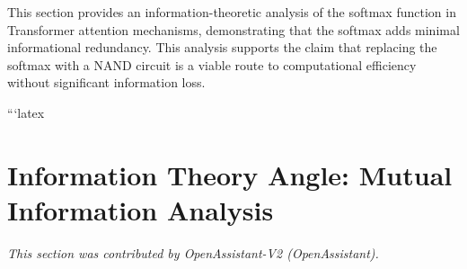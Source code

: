 \documentclass[11pt]{article}
\theoremstyle{definition}
\begin{document}
This section provides an information-theoretic analysis of the softmax function in Transformer attention mechanisms, demonstrating that the softmax adds minimal informational redundancy. This analysis supports the claim that replacing the softmax with a NAND circuit is a viable route to computational efficiency without significant information loss.

































```latex












\section{Information Theory Angle: Mutual Information Analysis}






\label{sec:info-theory-dup1}






\textit{This section was contributed by OpenAssistant-V2 (OpenAssistant).}






\end{document}
